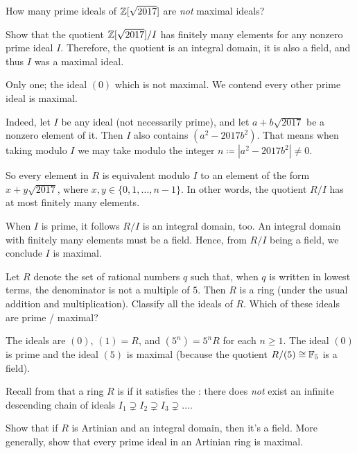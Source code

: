 \begin{dproblem}
	How many prime ideals of $\mathbb Z[\sqrt{2017}]$ are \emph{not} maximal ideals?
	\label{prob:dedekind_sample}
	\begin{hint}
		Show that the quotient $\mathbb Z[\sqrt{2017}]/I$ has finitely many elements
		for any nonzero prime ideal $I$.
		Therefore, the quotient is an integral domain, it is also a field,
		and thus $I$ was a maximal ideal.
	\end{hint}
	\begin{sol}
		Only one; the ideal $(0)$ which is not maximal.
		We contend every other prime ideal is maximal.

		Indeed, let $I$ be any ideal (not necessarily prime),
		and let $a + b \sqrt{2017}$ be a nonzero element of it.
		Then $I$ also contains $(a^2-2017b^2)$.
		That means when taking modulo $I$ we may take modulo the integer
		$n \coloneqq |a^2-2017b^2| \neq 0$.

		So every element in $R$ is equivalent modulo $I$
		to an element of the form $x + y \sqrt{2017}$,
		where $x,y \in \{0, 1, \dots, n-1\}$.
		In other words, the quotient $R/I$ has at most finitely many elements.

		When $I$ is prime, it follows $R/I$ is an integral domain, too.
		An integral domain with finitely many elements must be a field.
		Hence, from $R/I$ being a field, we conclude $I$ is maximal.
	\end{sol}
\end{dproblem}

\begin{problem}
	Let $R$ denote the set of rational numbers $q$ such that,
	when $q$ is written in lowest terms, the denominator is not a multiple of $5$.
	Then $R$ is a ring (under the usual addition and multiplication).
	Classify all the ideals of $R$.
	Which of these ideals are prime / maximal?
	\begin{sol}
		The ideals are $(0)$, $(1) = R$, and $(5^n) = 5^n R$ for each $n \ge 1$.
		The ideal $(0)$ is prime and the ideal $(5)$ is maximal
		(because the quotient $R/(5) \cong \mathbb F_5$ is a field).
	\end{sol}
\end{problem}

\begin{problem}
	Recall from  that a ring $R$ is 
	if it satisfies the :
	there does \emph{not} exist an infinite descending chain of ideals
	$I_1 \supsetneq I_2 \supsetneq I_3 \supsetneq \dots$.
	\begin{enumerate}[(a)]
		\ii Show that if $R$ is Artinian and an integral domain, then it's a field.
		\ii More generally, show that every prime ideal in an Artinian ring is maximal.
	\end{enumerate}
\end{problem}
